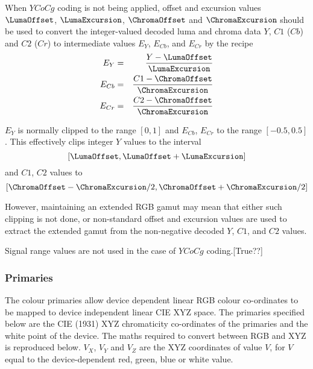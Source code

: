 \begin{informative*}
When $YCoCg$ coding is not being applied, offset and excursion values 
$\LumaOffset$, $\LumaExcursion$, $\ChromaOffset$ and
$\ChromaExcursion$ should be used to convert the
integer-valued decoded luma and chroma data $Y$, $C1$ ($Cb$) and $C2$ ($Cr$) 
to intermediate values $E_Y$, $E_{Cb}$, and $E_{Cr}$ by the recipe
\begin{eqnarray*}
E_Y & = & \dfrac{Y-\LumaOffset}{\LumaExcursion} \\
E_{Cb} & = & \dfrac{C1-\ChromaOffset}{\ChromaExcursion} \\
E_{Cr} & = & \dfrac{C2-\ChromaOffset}{\ChromaExcursion}
\end{eqnarray*}

$E_Y$ is normally clipped to the range $[0,1]$ and $E_{Cb}$, $E_{Cr}$
to the range $[-0.5,0.5]$. This effectively clips integer $Y$ values to 
the interval
\[ [\LumaOffset,\LumaOffset+\LumaExcursion] \]
and $C1$, $C2$ values to
\[ [\ChromaOffset-\ChromaExcursion/2,\ChromaOffset+\ChromaExcursion/2] \]

However, maintaining an extended RGB gamut may mean that either such
clipping is not done, or non-standard offset and excursion values are
used to extract the extended gamut from the non-negative decoded $Y$, $C1$,
and $C2$ values.

Signal range values are not used in the case of $YCoCg$ coding.[True??]

\begin{comment}
Non-default offset and excursion values cannot be coded if the chroma
format is YCoCg: default parameters should be used. However, even in
this case, EY, ECo, and ECg should not be calculated. Instead, direct
integer conversion to RGB should be done as described in Section . (In
fact, excursion values will be ignored in this integer conversion.)
\end{comment}

\subsubsection{Primaries}
\label{primaries}
The colour primaries allow device dependent linear RGB colour
co-ordinates to be mapped to device independent linear CIE XYZ space.
The primaries specified below are the CIE (1931) XYZ chromaticity
co-ordinates of the primaries and the white point of the device. The
maths required to convert between RGB and XYZ is reproduced below. $V_X$,
$V_Y$ and $V_Z$ are the XYZ coordinates of value $V$, for $V$ equal to
the device-dependent red, green, blue or white value.


\end{informative*}

